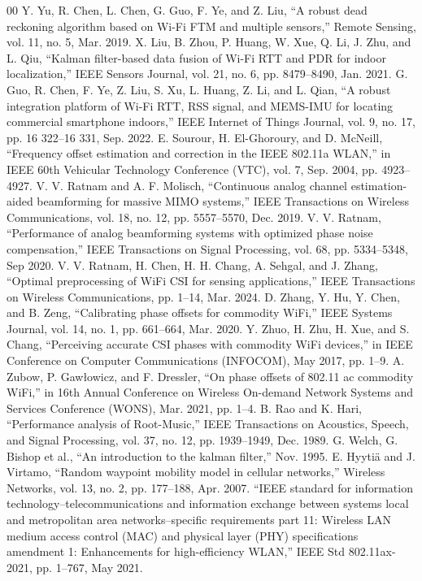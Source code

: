 \documentclass[journal]{IEEEtran}
\begin{document}
\begin{thebibliography}{00}
 Y. Yu, R. Chen, L. Chen, G. Guo, F. Ye, and Z. Liu, “A robust dead reckoning algorithm based on Wi-Fi FTM and multiple sensors,” Remote Sensing, vol. 11, no. 5, Mar. 2019.
 X. Liu, B. Zhou, P. Huang, W. Xue, Q. Li, J. Zhu, and L. Qiu, “Kalman filter-based data fusion of Wi-Fi RTT and PDR for indoor localization,” IEEE Sensors Journal, vol. 21, no. 6, pp. 8479–8490, Jan. 2021.
 G. Guo, R. Chen, F. Ye, Z. Liu, S. Xu, L. Huang, Z. Li, and L. Qian, “A robust integration platform of Wi-Fi RTT, RSS signal, and MEMS-IMU for locating commercial smartphone indoors,” IEEE Internet of Things Journal, vol. 9, no. 17, pp. 16 322–16 331, Sep. 2022.
 E. Sourour, H. El-Ghoroury, and D. McNeill, “Frequency offset estimation and correction in the IEEE 802.11a WLAN,” in IEEE 60th Vehicular Technology Conference (VTC), vol. 7, Sep. 2004, pp. 4923–4927.
 V. V. Ratnam and A. F. Molisch, “Continuous analog channel estimation-aided beamforming for massive MIMO systems,” IEEE Transactions on Wireless Communications, vol. 18, no. 12, pp. 5557–5570, Dec. 2019.
 V. V. Ratnam, “Performance of analog beamforming systems with optimized phase noise compensation,” IEEE Transactions on Signal Processing, vol. 68, pp. 5334–5348, Sep 2020.
 V. V. Ratnam, H. Chen, H. H. Chang, A. Sehgal, and J. Zhang, “Optimal preprocessing of WiFi CSI for sensing applications,” IEEE Transactions on Wireless Communications, pp. 1–14, Mar. 2024.
 D. Zhang, Y. Hu, Y. Chen, and B. Zeng, “Calibrating phase offsets for commodity WiFi,” IEEE Systems Journal, vol. 14, no. 1, pp. 661–664, Mar. 2020.
 Y. Zhuo, H. Zhu, H. Xue, and S. Chang, “Perceiving accurate CSI phases with commodity WiFi devices,” in IEEE Conference on Computer Communications (INFOCOM), May 2017, pp. 1–9.
 A. Zubow, P. Gawłowicz, and F. Dressler, “On phase offsets of 802.11 ac commodity WiFi,” in 16th Annual Conference on Wireless On-demand Network Systems and Services Conference (WONS), Mar. 2021, pp. 1–4.
 B. Rao and K. Hari, “Performance analysis of Root-Music,” IEEE Transactions on Acoustics, Speech, and Signal Processing, vol. 37, no. 12, pp. 1939–1949, Dec. 1989.
 G. Welch, G. Bishop et al., “An introduction to the kalman filter,” Nov. 1995.
 E. Hyyti\"a and J. Virtamo, “Random waypoint mobility model in cellular networks,” Wireless Networks, vol. 13, no. 2, pp. 177–188, Apr. 2007.
 “IEEE standard for information technology–telecommunications and information exchange between systems local and metropolitan area networks–specific requirements part 11: Wireless LAN medium access control (MAC) and physical layer (PHY) specifications amendment 1: Enhancements for high-efficiency WLAN,” IEEE Std 802.11ax-2021, pp. 1–767, May 2021.

\end{thebibliography}
\end{document}
